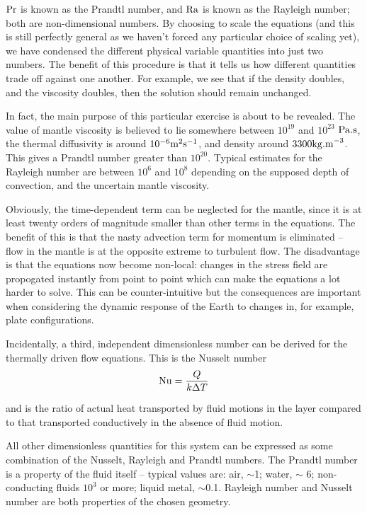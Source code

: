 \documentclass[10pt]{article}
\begin{document}
	$\rm Pr$ is known as the Prandtl number, and $\rm Ra$ is known as the Rayleigh number; both
	are non-dimensional numbers.
	By choosing to scale the equations (and this is still perfectly general as we haven't 
	forced any particular choice of scaling yet), we have condensed the different physical
	variable quantities into just two numbers. The benefit of this procedure is that
	it tells us how different quantities trade off against one another. For example, we
	see that if the density doubles, and the viscosity doubles, then the solution should
	remain unchanged.
	
	In fact, the main purpose of this particular exercise is about to be revealed. The 
	value of mantle viscosity is believed to lie somewhere between $10^{19}$ and 
	$10^{23}$ ${\rm Pa . s}$, the thermal diffusivity is around $10^{-6}{\rm m}^2{\rm s}^{-1}$,
	and density around $3300 {\rm kg . m}^{-3}$. This gives a Prandtl number greater than
	$10^{20}$. Typical estimates for the Rayleigh number are between $10^6$ and $10^8$
	depending on the supposed depth of convection, and the uncertain mantle viscosity. 
	
Obviously, the time-dependent term can be neglected for the mantle, since it
is at least twenty orders of magnitude smaller than other terms in the
equations. The benefit of this is that the nasty advection term for momentum
is eliminated -- flow in the mantle is at the opposite extreme to turbulent
flow. The disadvantage is that the equations now become non-local: changes in
the stress field are propogated instantly from point to point which can make
the equations a lot harder to solve. This can be counter-intuitive but the
consequences are important when considering the dynamic response of the Earth
to changes in, for example, plate configurations.

 Incidentally, a third, independent dimensionless number can be derived for
the thermally driven flow equations. This is the Nusselt number
\begin{equation}
			{\rm Nu} = \frac{Q}{k\Delta T}
\end{equation}
		
and is the ratio of actual heat transported by fluid motions in the layer compared to that transported conductively in the absence of fluid motion.

 All other dimensionless quantities for this system can be expressed as some
combination of the Nusselt, Rayleigh and Prandtl numbers. The Prandtl number
is a property of the fluid itself -- typical values are: air, $\sim$1; water,
$\sim$ 6; non-conducting fluids $10^3$ or more; liquid metal, $\sim$0.1.
Rayleigh number and Nusselt number are both properties of the chosen geometry.
	
\end{document}
